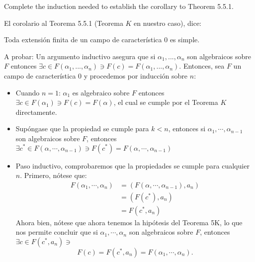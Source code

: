 \begin{problema}[Problema 5]
    Complete the induction needed to establish the corollary to Theorem 5.5.1.
    \begin{dem}
        El corolario al Teorema 5.5.1 (Teorema $K$ en nuestro caso), dice:\bigbreak
        \begin{center}
            Toda extensión finita de un campo de característica 0 es simple.
        \end{center}
        
        A probar: Un argumento inductivo asegura que si $\alpha_1,..., \alpha_n$ son
        algebraicos sobre $F$ entonces $\exists c \in F(\alpha_1,..., \alpha_n) \ni F(c) = F(\alpha_1,..., \alpha_n)$. Entonces, sea $F$ un campo de característica 0 y procedemos por inducción sobre $n$: 
        \begin{itemize}
            \item Cuando $n=1$: $\alpha_1$ es algebraico sobre $F$ entonces $\exists c\in F(\alpha_1)\ni F(c)=F(\alpha)$, el cual se cumple por el Teorema $K$ directamente.
            \item Supóngase que la propiedad se cumple para $k<n$, entonces si $\alpha_1,\cdots, \alpha_{n-1}$ son algebraicos sobre $F$, entonces $\exists c^*\in F(\alpha,\cdots, \alpha_{n-1})\ni F(c^*)=F(\alpha,\cdots,\alpha_{n-1})$
            \item Paso inductivo, comprobaremos que la propiedades se cumple para cualquier $n$. Primero, nótese que:
            \begin{align*}
                F(\alpha_1,\cdots,\alpha_n) &= (F(\alpha,\cdots,\alpha_{n-1}),a_n)\\
                &= (F(c^*),a_n)\\
                &= F(c^*,a_n)
            \end{align*}
            Ahora bien, nótese que ahora tenemos la hipótesis del Teorema 5K, lo que nos permite concluir que si $\alpha_1,\cdots,\alpha_n$ son algebraicos sobre $F$, entonces $\exists c\in F(c^*,a_n)\ni$
            $$F(c)=F(c^*,a_n)=F(\alpha_1,\cdots,\alpha_n).$$
        \end{itemize}

    \end{dem}
\end{problema}

